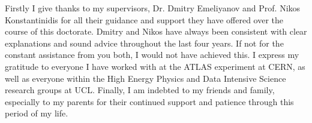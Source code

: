 Firstly I give thanks to my supervisors, Dr. Dmitry Emeliyanov and Prof. Nikos Konstantinidis for all their guidance and support they have offered over the course of this doctorate. Dmitry and Nikos have always been consistent with clear explanations and sound advice throughout the last four years. If not for the constant assistance from you both, I would not have achieved this. I express my gratitude to everyone I have worked with at the ATLAS experiment at CERN, as well as everyone within the High Energy Physics and Data Intensive Science research groups at UCL. Finally, I am indebted to my friends and family, especially to my parents for their continued support and patience through this period of my life.